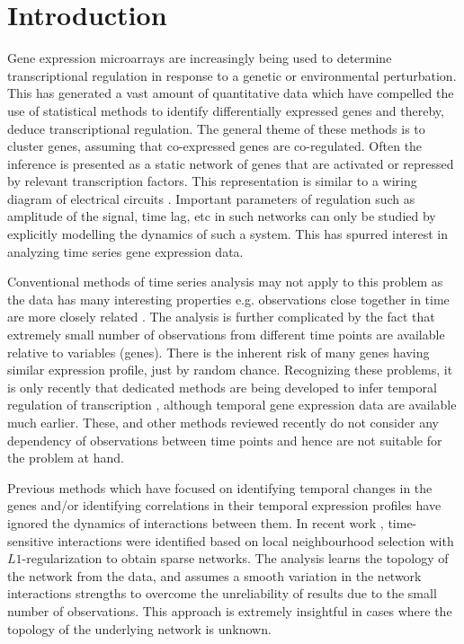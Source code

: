 \documentclass{bioinfo}
\begin{document}
\section{Introduction}
Gene expression microarrays are increasingly being used to determine transcriptional regulation  in response to a genetic or environmental perturbation. 
This has generated a vast amount of quantitative data which have compelled the use of statistical methods to identify differentially expressed genes and 
thereby, deduce transcriptional regulation. 
The general theme of these methods is to cluster genes, assuming that co-expressed genes are co-regulated. Often the inference is presented as a static network of genes that are activated or repressed by relevant transcription factors. 
This representation is similar to a wiring diagram of electrical circuits \citep{Stigler2007}. Important parameters of regulation such as amplitude of the 
signal, time lag, etc in such networks can only be studied by explicitly 
modelling the dynamics of such a system. This has spurred interest in 
analyzing time series gene expression data.

Conventional methods of time series analysis may not apply to this 
problem as the data has many interesting properties e.g.  observations close together in time are more closely related \citep{Glass1993}. The analysis is 
further complicated  by the fact that
 extremely small number of observations from different time points are available relative to variables (genes). 
There is the inherent risk of many genes having similar expression profile, just by random chance. Recognizing these problems, it is only recently that dedicated methods are being developed to infer temporal regulation of transcription \citep{Leek06EDGE, Ernst06STEM, Ramoni02cluster}, although temporal gene expression data are available much earlier. 
These, and other methods reviewed recently \citep{Androulakis2007} do not consider any dependency of observations between time points and hence are not suitable for the problem at hand.



Previous methods which have focused on identifying temporal changes in the genes and/or identifying correlations in their temporal expression profiles 
have ignored the dynamics of interactions between them. 
In recent work \citep{Song09KELLER}, time-sensitive interactions were identified based on local neighbourhood selection with $L1$-regularization to obtain sparse networks. The analysis learns the topology of the network from the data, and assumes a
smooth variation in the network interactions strengths to overcome the unreliability of results due to the small number of observations. 
This approach is extremely insightful in cases where the topology of the underlying network is unknown. 
\end{document}
